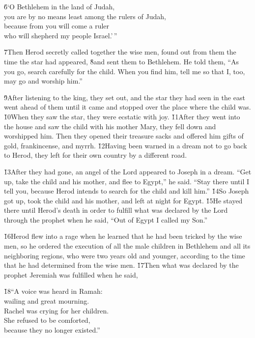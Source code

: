 \begin{poetry}
\poeml \v{6}`O Bethlehem in the land of Judah, \\
\poemll    you are by no means least among the rulers of Judah, \\
\poeml because from you will come a ruler \\
\poemll    who will shepherd my people Israel.'\,''
\end{poetry}

\v{7}Then Herod secretly called together the wise men, found out from them the time the star had appeared, \v{8}and sent them to Bethlehem. He told them, ``As you go, search carefully for the child. When you find him, tell me so that I, too, may go and worship him.''

\v{9}After listening to the king, they set out, and the star they had seen in the east went ahead of them until it came and stopped over the place where the child was. \v{10}When they saw the star, they were ecstatic with joy. \v{11}After they went into the house and saw the child with his mother Mary, they fell down and worshipped him. Then they opened their treasure sacks and offered him gifts of gold, frankincense, and myrrh. \v{12}Having been warned in a dream not to go back to Herod, they left for their own country by a different road.

\v{13}After they had gone, an angel of the Lord appeared to Joseph in a dream. ``Get up, take the child and his mother, and flee to Egypt,'' he said. ``Stay there until I tell you, because Herod intends to search for the child and kill him.'' \v{14}So Joseph got up, took the child and his mother, and left at night for Egypt. \v{15}He stayed there until Herod's death in order to fulfill what was declared by the Lord through the prophet when he said, ``Out of Egypt I called my Son.''

\v{16}Herod flew into a rage when he learned that he had been tricked by the wise men, so he ordered the execution of all the male children in Bethlehem and all its neighboring regions, who were two years old and younger, according to the time that he had determined from the wise men. \v{17}Then what was declared by the prophet Jeremiah was fulfilled when he said,

\begin{poetry}
\poeml \v{18}``A voice was heard in Ramah: \\
\poemll    wailing and great mourning. \\
\poeml Rachel was crying for her children. \\
\poemll    She refused to be comforted, \\
\poemlll       because they no longer existed.''
\end{poetry}

